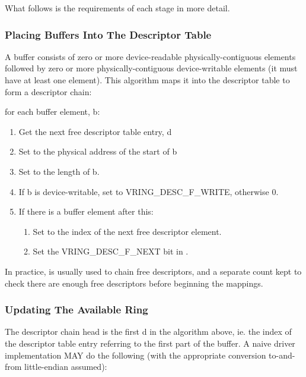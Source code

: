 What follows is the requirements of each stage in more detail.

\subsubsection{Placing Buffers Into The Descriptor Table}\label{sec:General Initialization And Device Operation / Device Operation / Supplying Buffers to The Device / Placing Buffers Into The Descriptor Table}

A buffer consists of zero or more device-readable physically-contiguous
elements followed by zero or more physically-contiguous
device-writable elements (it must have at least one element). This
algorithm maps it into the descriptor table to form a descriptor
chain:

for each buffer element, b:

\begin{enumerate}
\item Get the next free descriptor table entry, d
\item Set  to the physical address of the start of b
\item Set  to the length of b.
\item If b is device-writable, set  to VRING_DESC_F_WRITE,
    otherwise 0.
\item If there is a buffer element after this:
    \begin{enumerate}
    \item Set  to the index of the next free descriptor
      element.
    \item Set the VRING_DESC_F_NEXT bit in .
    \end{enumerate}
\end{enumerate}

In practice,  is usually used to chain free
descriptors, and a separate count kept to check there are enough
free descriptors before beginning the mappings.

\subsubsection{Updating The Available Ring}\label{sec:General Initialization And Device Operation / Device Operation / Supplying Buffers to The Device / Updating The Available Ring}

The descriptor chain head is the first d in the algorithm
above, ie. the index of the descriptor table entry referring to the first
part of the buffer.  A naive driver implementation MAY do the following (with the
appropriate conversion to-and-from little-endian assumed):

